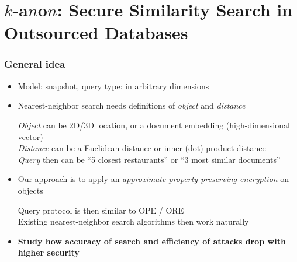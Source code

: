 \section{$k$-a$n$o$n$: Secure Similarity Search in Outsourced Databases \cite{k-anon}}

	\begin{frame}[label={frame:knn}]

		\frametitle{General idea}

		\begin{itemize}
			\item<1->
				Model: \alert{snapshot}, query type: \alert{\knn{}} in arbitrary dimensions

			\item<2->
				Nearest-neighbor search needs definitions of \emph{object} and \emph{distance} \\
				\begin{small}
					\indent{} \emph{Object} can be 2D/3D location, or a document embedding (high-dimensional vector) \\
					\indent{} \emph{Distance} can be a Euclidean distance  or inner (dot) product distance \\
					\indent{} \emph{Query} then can be ``5 closest restaurants'' or ``3 most similar documents''
				\end{small}

			\item<3->
				Our approach is to apply an \emph{approximate property-preserving encryption} on objects \\
				\begin{small}
					\indent{} Query protocol is then similar to OPE / ORE \\
					\indent{} Existing nearest-neighbor search algorithms then work naturally
				\end{small}

			\item<4->
				\textbf{Study how accuracy of search and efficiency of attacks drop with higher security}

		\end{itemize}

	\end{frame}

